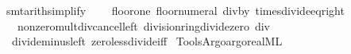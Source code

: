 \begin{isabellebody}
\isanewline
{}\isamarkupfalse%
\ {\isacharbrackleft}{\kern0pt}smt{\isacharunderscore}{\kern0pt}arith{\isacharunderscore}{\kern0pt}simplify{\isacharbrackright}{\kern0pt}\ {\isacharequal}{\kern0pt}\isanewline
\ \ \ floor{\isacharunderscore}{\kern0pt}one\ floor{\isacharunderscore}{\kern0pt}numeral\ div{\isacharunderscore}{\kern0pt}by{\isacharunderscore}{\kern0pt}{}\ times{\isacharunderscore}{\kern0pt}divide{\isacharunderscore}{\kern0pt}eq{\isacharunderscore}{\kern0pt}right\isanewline
\ \ \ nonzero{\isacharunderscore}{\kern0pt}mult{\isacharunderscore}{\kern0pt}div{\isacharunderscore}{\kern0pt}cancel{\isacharunderscore}{\kern0pt}left\ division{\isacharunderscore}{\kern0pt}ring{\isacharunderscore}{\kern0pt}divide{\isacharunderscore}{\kern0pt}zero\ div{\isacharunderscore}{\kern0pt}{}\isanewline
\ \ divide{\isacharunderscore}{\kern0pt}minus{\isacharunderscore}{\kern0pt}left\ zero{\isacharunderscore}{\kern0pt}less{\isacharunderscore}{\kern0pt}divide{\isacharunderscore}{\kern0pt}iff%
\isadelimdocument
%
\endisadelimdocument
%
\isatagdocument
%
\isamarkuptrue%
%
\endisatagdocument
{\isafolddocument}%
%
\isadelimdocument
%
\endisadelimdocument
%
\isadelimML
%
\endisadelimML
%
\isatagML
{}\isamarkupfalse%
\ {\isacartoucheopen}Tools{\isacharslash}{\kern0pt}Argo{\isacharslash}{\kern0pt}argo{\isacharunderscore}{\kern0pt}real{\isachardot}{\kern0pt}ML{\isacartoucheclose}%
\endisatagML
{\isafoldML}%
%
\isadelimML
%
\endisadelimML
\isanewline
%
\isadelimtheory
\isanewline
%
\endisadelimtheory
%
\isatagtheory
{}\isamarkupfalse%
%
\endisatagtheory
{\isafoldtheory}%
%
\isadelimtheory
%
\endisadelimtheory
%
\end{isabellebody}%
\endinput
